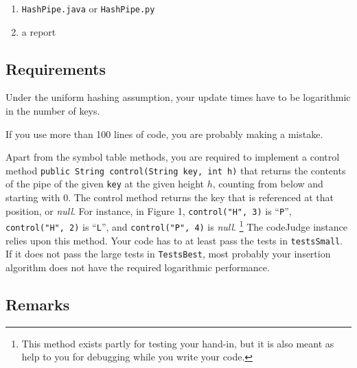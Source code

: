\documentclass{tufte-handout}
\begin{document}
\begin{enumerate}
\item {\tt HashPipe.java} or {\tt HashPipe.py} 
\item a report
\end{enumerate}

\subsection{Requirements}

Under the uniform hashing assumption, your update times have to be logarithmic in the number of keys.

If you use more than 100 lines of code, you are probably making a mistake.

Apart from the symbol table methods, you are required to implement a control method {\tt public String control(String key, int h)} that returns the contents of the pipe of the given {\tt key} at the given height $h$, counting from below and starting with $0$.
The control method returns the key that is referenced at that position, or \emph{null}.
For instance, in Figure 1, {\tt control("H", 3)} is ``{\tt P}'', {\tt control("H", 2)} is ``{\tt L}'', and {\tt control("P", 4)} is \emph{null}.
\footnote{This method exists partly for testing your hand-in, but it is also meant as help to you for debugging while you write your code.}
The codeJudge instance relies upon this method. 
Your code has to at least pass the tests in \texttt{testsSmall}.
If it does not pass the large tests in \texttt{TestsBest}, most probably your insertion algorithm does not have the required logarithmic performance.
\subsection{Remarks}
\end{document}
